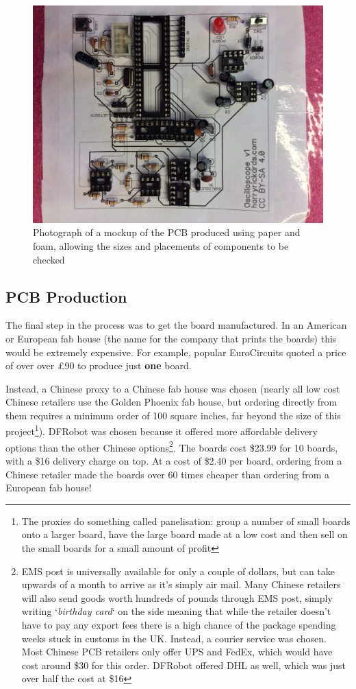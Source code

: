 \begin{figure}[H]
  \includegraphics[width=\linewidth]{img/pcb/pcbFoam.jpg}
  \caption[PCB (Mockup)]{Photograph of a mockup of the PCB produced using paper and foam,
  allowing the sizes and placements of components to be checked}
  \label{fig:pcbFoam}
\end{figure}

\subsection{PCB Production}
The final step in the process was to get the board manufactured. In an American
or European fab house (the name for the company that prints the boards) this
would be extremely expensive. For example, popular EuroCircuits quoted a price
of over over \pounds 90 to produce just \textbf{one} board.

Instead, a Chinese proxy to a Chinese fab house was chosen (nearly all low cost
Chinese retailers use the Golden Phoenix fab house, but ordering directly from
them requires a minimum order of 100 square inches, far beyond the size of this
project\footnote{The proxies do something called panelisation: group a number of
small boards onto a larger board, have the large board made at a low cost and
then sell on the small boards for a small amount of profit}). DFRobot was chosen
because it offered more affordable delivery options than the other Chinese
options\footnote{EMS post is universally available for only a couple of dollars,
  but can take upwards of a month to arrive as it's simply air mail. Many
  Chinese retailers will also send goods worth hundreds of pounds through EMS
  post, simply writing `\textit{birthday card}` on the side meaning that while
  the retailer doesn't have to pay any export fees there is a high chance of the
  package spending weeks stuck in customs in the UK. Instead, a courier service
was chosen. Most Chinese PCB retailers only offer UPS and FedEx, which would
have cost around \$30 for this order. DFRobot offered DHL as well, which was
just over half the cost at \$16}. The boards cost \$23.99 for 10 boards, with a
\$16 delivery charge on top. At a cost of \$2.40 per board, ordering from a
Chinese retailer made the boards over 60 times cheaper than ordering from a
European fab house!

